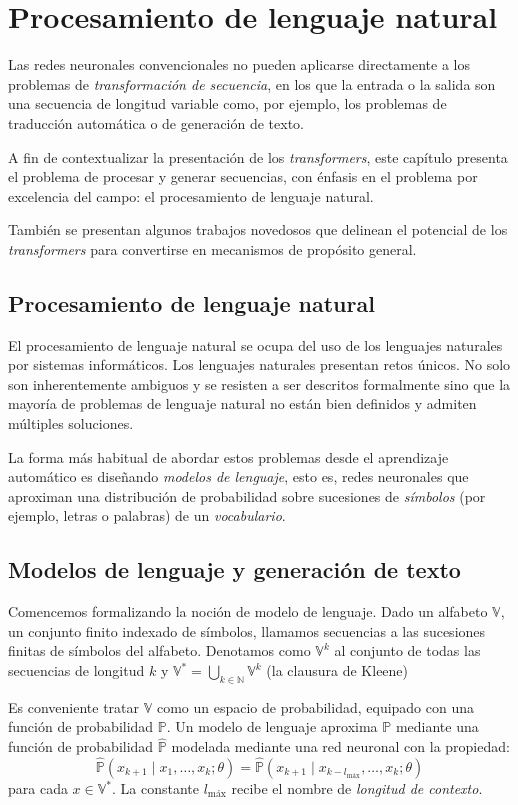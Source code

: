 \chapter{Procesamiento de lenguaje natural}
Las redes neuronales convencionales no pueden aplicarse directamente a los problemas de \textit{transformación de secuencia}, en los que la entrada o la salida son una secuencia de longitud variable como, por ejemplo, los problemas de traducción automática o de generación de texto.

A fin de contextualizar la presentación de los \textit{transformers}, este capítulo presenta el problema de procesar y generar secuencias, con énfasis en el problema por excelencia del campo: el procesamiento de lenguaje natural.

También se presentan algunos trabajos novedosos que delinean el potencial de los \textit{transformers} para convertirse en mecanismos de propósito general.

\section{Procesamiento de lenguaje natural}
El procesamiento de lenguaje natural se ocupa del uso de los lenguajes naturales por sistemas informáticos. Los lenguajes naturales presentan retos únicos. No solo son inherentemente ambiguos y se resisten a ser descritos formalmente sino que la mayoría de problemas de lenguaje natural no están bien definidos y admiten múltiples soluciones. 

La forma más habitual de abordar estos problemas desde el aprendizaje automático es diseñando \textit{modelos de lenguaje}, esto es, redes neuronales que aproximan una distribución de probabilidad sobre sucesiones de \textit{símbolos} (por ejemplo, letras o palabras) de un \textit{vocabulario}.

\section{Modelos de lenguaje y generación de texto}
Comencemos formalizando la noción de modelo de lenguaje. Dado un alfabeto \( \mathbb{V} \), un conjunto finito indexado de símbolos, llamamos secuencias a las sucesiones finitas de símbolos del alfabeto. Denotamos como \( \mathbb{V}^k \) al conjunto de todas las secuencias de longitud \( k \) y \( \mathbb{V}^* = \bigcup_{k \in \mathbb{N}} \mathbb{V}^k \) (la clausura de Kleene)

Es conveniente tratar \( \mathbb{V} \) como un espacio de probabilidad, equipado con una función de probabilidad \( \mathbb{P} \). Un modelo de lenguaje aproxima \( \mathbb{P} \) mediante una función de probabilidad \( \widehat{\mathbb{P}} \) modelada mediante una red neuronal con la propiedad:
\begin{equation}\label{eq:prob}
    \widehat{\mathbb{P}} \left( x_{k+1} \mid  x_1, …, x_k; \theta \right) = \widehat{\mathbb{P}} \left( x_{k+1} \mid x_{k - l_\text{máx}}, …, x_k; \theta \right) 
\end{equation}
para cada \( x \in \mathbb{V}^* \). La constante \( l_\text{máx} \) recibe el nombre de \textit{longitud de contexto}.


